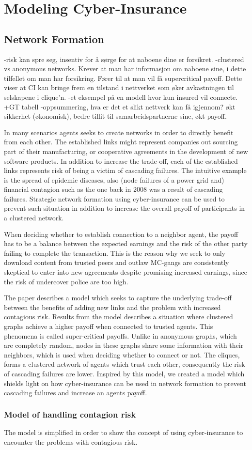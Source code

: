 \chapter{Modeling Cyber-Insurance }
\label{chp:modelingCyberInsurance} 


\section{Network Formation}

-risk kan spre seg, insentiv for å sørge for at naboene dine er forsikret.
-clustered vs anonymous networks. Krever at man har informasjon om naboene sine, i dette tilfellet om man har forsikring. Fører til at man vil få supercritical payoff. Dette viser at CI kan bringe frem en tilstand i nettverket som øker avkastningen til selskapene i clique'n.
-et eksempel på en modell hvor kun insured vil connecte. +GT tabell 
-oppsummering, hva er det et slikt nettverk kan få igjennom? økt sikkerhet (økonomisk), bedre tillit til samarbeidspartnerne sine, økt payoff. 


In many scenarios agents seeks to create networks in order to directly benefit from each other. The established links might represent companies out sourcing part of their manufacturing, or cooperative agreements in the development of new software products. In addition to increase the trade-off, each of the established links represents risk of being a victim of cascading failures. The intuitive example is the spread of epidemic diseases, also  (node failures of a power grid and) financial contagion such as the one back in 2008 was a result of cascading failures. Strategic network formation using cyber-insurance can be used to prevent such situation in addition to increase the overall payoff of participants in a clustered network.


When deciding whether to establish connection to a neighbor agent, the payoff has to be a balance between the expected earnings and the risk of the other party failing to complete the transaction. This is the reason why we seek to only download content from trusted peers and outlaw MC-gangs are consistently skeptical to enter into new agreements despite promising increased earnings, since the risk of undercover police are too high. 


The paper \cite{contagion} describes a model which seeks to capture the underlying trade-off between the benefits of adding new links and the problem with increased contagious risk. Results from the model describes a situation where clustered graphs achieve a higher payoff when connected to trusted agents. This phenomena is called super-critical payoffs. Unlike in anonymous graphs, which are completely random, nodes in these graphs share some information with their neighbors, which is used when deciding whether to connect or not. The cliques, forms a clustered network of agents which trust each other, consequently the risk of cascading failures are lower.
Inspired by this model, we created a model which shields light on how cyber-insurance can be used in network formation to prevent cascading failures and increase an agents payoff.  

\subsection{Model of handling contagion risk}
The model is simplified in order to show the concept of using cyber-insurance to encounter the problems with contagious risk. 